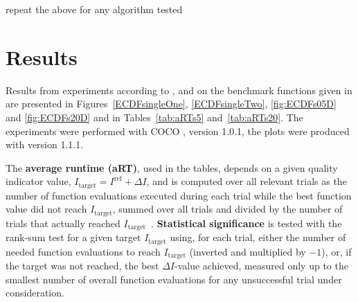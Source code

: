 \documentclass{sig-alternate}
\newcommand{\DI}{\ensuremath{\Delta I}}
\newcommand{\Itarget}{\ensuremath{I_\mathrm{target}}}
\newcommand{\change}[1]{{\color{red} #1}}
\newcommand{\hvref}{I^{\mathrm{ref}}}
\begin{document}
\change{repeat the above for any algorithm tested}

\section{Results}

Results from experiments according to \cite{hansen2016exp},
\cite{hansen2016perfass} and \cite{biobj2016perfass} on the benchmark
functions given in \cite{biobj2016func} are presented in
Figures~\ref{ECDFsingleOne}, \ref{ECDFsingleTwo}, \ref{fig:ECDFs05D} and
\ref{fig:ECDFs20D} and in Tables~\ref{tab:aRTs5} and~\ref{tab:aRTs20}.
The experiments were performed with COCO \cite{hansen2016cocoplat}, version
\change{1.0.1}, the plots were produced with version \change{1.1.1}.

The \textbf{average runtime (aRT)}, used in the %
tables,
depends on a given quality indicator value, $\Itarget=\hvref+\DI$, and is
computed over all relevant trials as the number of function
evaluations executed during each trial while the best function value
did not reach \Itarget, summed over all trials and divided by the
number of trials that actually reached \Itarget\
\cite{hansen2016exp,price1997dev}.  \textbf{Statistical significance}
is tested with the rank-sum test for a given target $\Itarget$
using, for each trial,
either the number of needed function evaluations to reach
$\Itarget$ (inverted and multiplied by $-1$), or, if the target
was not reached, the best $\DI$-value achieved, measured only up to
the smallest number of overall function evaluations for any
unsuccessful trial under consideration.




\end{document}
